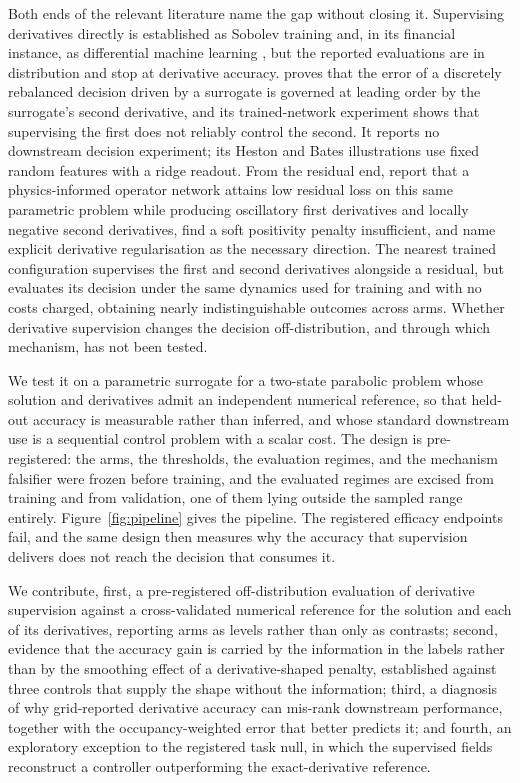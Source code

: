 \documentclass{article}
\begin{document}
Both ends of the relevant literature name the gap without closing it. Supervising
derivatives directly is established as Sobolev training
\citep{czarnecki2017sobolev} and, in its financial instance, as differential
machine learning \citep{huge2020differential}, but the reported evaluations are
in distribution and stop at derivative accuracy.
\citet{noguer2026derivative} proves that the error of a discretely rebalanced
decision driven by a surrogate is governed at leading order by the surrogate's
second derivative, and its trained-network experiment shows that supervising the
first does not reliably control the second. It reports no downstream decision
experiment; its Heston and Bates illustrations use fixed random features with a
ridge readout. From the residual end, \citet{chakhoyan2025deepsvm} report that a
physics-informed operator network attains low residual loss on this same
parametric problem while producing oscillatory first derivatives and locally
negative second derivatives, find a soft positivity penalty insufficient, and
name explicit derivative regularisation as the necessary direction. The nearest
trained configuration \citep{sakuma2026a} supervises the first and second
derivatives alongside a residual, but evaluates its decision under the same
dynamics used for training and with no costs charged, obtaining nearly
indistinguishable outcomes across arms. Whether derivative supervision changes
the decision off-distribution, and through which mechanism, has not been tested.

We test it on a parametric surrogate for a two-state parabolic problem whose
solution and derivatives admit an independent numerical reference, so that
held-out accuracy is measurable rather than inferred, and whose standard
downstream use is a sequential control problem with a scalar cost. The design is
pre-registered: the arms, the thresholds, the evaluation regimes, and the
mechanism falsifier were frozen before training, and the evaluated regimes are
excised from training and from validation, one of them lying outside the sampled
range entirely. Figure~\ref{fig:pipeline} gives the pipeline. The registered
efficacy endpoints fail, and the same design then measures why the accuracy that
supervision delivers does not reach the decision that consumes it.

We contribute, first, a pre-registered off-distribution evaluation of derivative
supervision against a cross-validated numerical reference for the solution and each
of its derivatives, reporting arms as levels rather than only as contrasts; second,
evidence that the accuracy gain is carried by the information in the labels rather
than by the smoothing effect of a derivative-shaped penalty, established against
three controls that supply the shape without the information; third, a diagnosis of
why grid-reported derivative accuracy can mis-rank downstream performance, together
with the occupancy-weighted error that better predicts it; and fourth, an
exploratory exception to the registered task null, in which the supervised fields
reconstruct a controller outperforming the exact-derivative reference.
\end{document}
